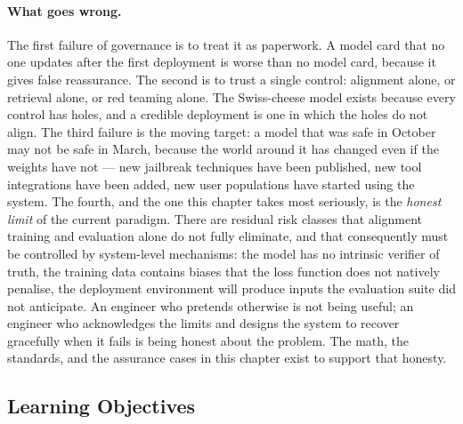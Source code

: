 \paragraph{What goes wrong.}
The first failure of governance is to treat it as paperwork. A model
card that no one updates after the first deployment is worse than no
model card, because it gives false reassurance. The second is to
trust a single control: alignment alone, or retrieval alone, or red
teaming alone. The Swiss-cheese model exists because every control
has holes, and a credible deployment is one in which the holes do
not align. The third failure is the moving target: a model that was
safe in October may not be safe in March, because the world around
it has changed even if the weights have not --- new jailbreak
techniques have been published, new tool integrations have been
added, new user populations have started using the system. The
fourth, and the one this chapter takes most seriously, is the
\emph{honest limit} of the current paradigm. There are residual
risk classes that alignment training and evaluation alone do not
fully eliminate, and that consequently must be controlled by
system-level mechanisms: the model has no intrinsic verifier of
truth, the training data contains biases that the loss function
does not natively penalise,
the deployment environment will produce inputs the evaluation suite
did not anticipate. An engineer who pretends otherwise is not being
useful; an engineer who acknowledges the limits and designs the
system to recover gracefully when it fails is being honest about the
problem. The math, the standards, and the assurance cases in this
chapter exist to support that honesty.

\subsection{Learning Objectives}

